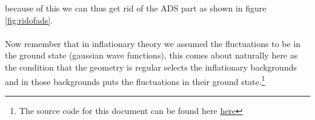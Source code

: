 \documentclass{article}
\begin{document}
  because of this we can thus get rid of the ADS part as shown in figure \ref{fig:ridofads}.\\\\
  Now remember that in inflationary theory we assumed the fluctuations to be in the ground state (gaussian wave functions), this comes about naturally here as the condition that the geometry is regular selects the inflationary backgrounds and in those backgrounds puts the fluctuations in their ground state.\footnote{The source code for this document can be found here \href{https://github.com/arthuradriaens-code/Early-Universe-Cosmology/tree/main/QC}{here}}
\end{document}
